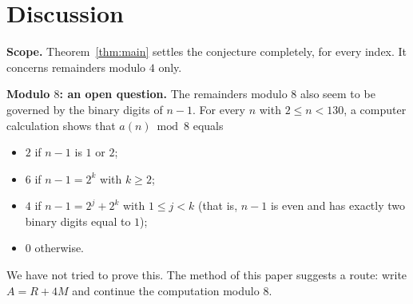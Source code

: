 \documentclass[11pt,a4paper]{article}
\theoremstyle{definition}
\theoremstyle{remark}
\newcommand{\para}[1]{\par\medskip\noindent\textbf{#1}\enspace}
\begin{document}
\section{Discussion}\label{sec:discussion}

\para{Scope.} Theorem~\ref{thm:main} settles the conjecture completely, for every index. It concerns remainders modulo
$4$ only.

\para{Modulo $8$: an open question.} The remainders modulo $8$ also seem to be governed by the binary digits of $n-1$.
For every $n$ with $2\le n<130$, a computer calculation shows that $a(n)\bmod 8$ equals
\begin{itemize}
\item $2$ if $n-1$ is $1$ or $2$;
\item $6$ if $n-1=2^k$ with $k\ge2$;
\item $4$ if $n-1=2^j+2^k$ with $1\le j<k$ (that is, $n-1$ is even and has exactly two binary digits equal to $1$);
\item $0$ otherwise.
\end{itemize}
We have not tried to prove this. The method of this paper suggests a route: write $A=R+4M$ and continue the computation
modulo $8$.
\end{document}

